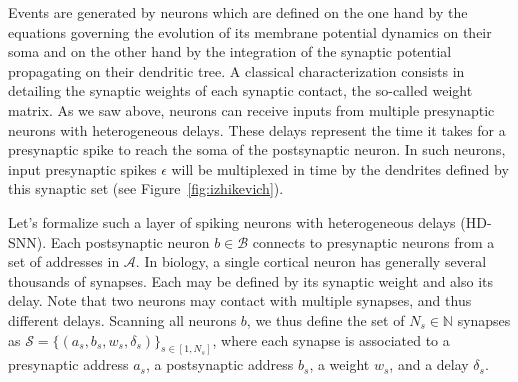 \documentclass[runningheads]{llncs}
\newcommand{\presynaddr}{a} %
\newcommand{\postsynaddr}{b} %
\newcommand{\presynaddrspace}{\mathcal{A}} %
\newcommand{\postsynaddrspace}{\mathcal{B}} %
\newcommand{\synapse}{\mathcal{S}} %
\newcommand{\synapticweight}{w} %
\newcommand{\synapticdelay}{\delta} %
\newcommand{\ranksyn}{s} %
\newcommand{\Nsyn}{N_{s}} %
\newcommand{\event}{\epsilon} %
\begin{document}
Events are generated by neurons which are defined on the one hand by the equations governing the evolution of its membrane potential dynamics on their soma and on the other hand by the integration of the synaptic potential propagating on their dendritic tree. A classical characterization consists in detailing the synaptic weights of each synaptic contact, the so-called weight matrix. As we saw above, neurons can receive inputs from multiple presynaptic neurons with heterogeneous delays. These delays represent the time it takes for a presynaptic spike to reach the soma of the postsynaptic neuron. 
In such neurons, %
input presynaptic spikes $\event$ will be multiplexed in time by the dendrites defined by this synaptic set (see Figure~\ref{fig:izhikevich}). %

Let's formalize such a layer of spiking neurons with heterogeneous delays (HD-SNN). Each postsynaptic neuron $\postsynaddr \in \postsynaddrspace$  connects to presynaptic neurons from a set of addresses in  $\presynaddrspace$. In biology, a single cortical neuron has generally several thousands of synapses. Each may be defined by its synaptic weight and also its delay. %
Note that two neurons may contact with multiple synapses, and thus different delays. Scanning all neurons $\postsynaddr$, we thus define the set of $\Nsyn \in \mathbb{N}$ synapses  as  $\synapse = \{(\presynaddr_\ranksyn, \postsynaddr_\ranksyn, \synapticweight_\ranksyn, \synapticdelay_\ranksyn)\}_{\ranksyn \in [1,\Nsyn]}$, where each synapse is associated to a presynaptic address $\presynaddr_\ranksyn$, a postsynaptic address $\postsynaddr_\ranksyn$,  a weight $\synapticweight_\ranksyn$, and a delay $\synapticdelay_\ranksyn$. 
\end{document}
